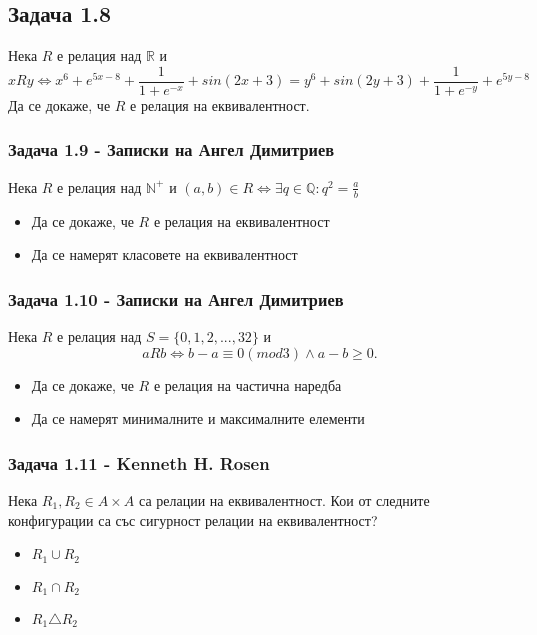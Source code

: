 \documentclass[12pt]{article}
\begin{document}
\subsection*{Задача 1.8}
Нека $R$ е релация над $\mathbb{R}$ и 
\begin{equation*}
    xRy \iff x^6 + e^{5x - 8} + \frac{1}{1+e^{-x}} + sin(2x + 3) = y^6 + sin(2y + 3) + \frac{1}{1+e^{-y}} + e^{5y - 8}
\end{equation*}
Да се докаже, че $R$ е релация на еквивалентност.

\subsubsection*{Задача 1.9 - Записки на Ангел Димитриев}
Нека $R$ е релация над $\mathbb{N}^+$ и $(a, b) \in R \iff \exists q \in \mathbb{Q}: q^2 = \frac{a}{b}$
\begin{itemize}
    \item Да се докаже, че $R$ е релация на еквивалентност
    \item Да се намерят класовете на еквивалентност
\end{itemize}

\subsubsection*{Задача 1.10 - Записки на Ангел Димитриев}
Нека $R$ е релация над $S = \{ 0, 1, 2, ..., 32 \}$ и 
\begin{equation*}
    aRb \iff b - a \equiv 0 (mod 3) \land a - b \geq 0.
\end{equation*}

\begin{itemize}
    \item Да се докаже, че $R$ е релация на частична наредба
    \item Да се намерят минималните и максималните елементи
\end{itemize}

\subsubsection*{Задача 1.11 - Kenneth H. Rosen}
Нека $R_1, R_2 \in A \times A$ са релации на еквивалентност. Кои от следните конфигурации са със сигурност релации на еквивалентност?
\begin{itemize}
    \item $R_1 \cup R_2$
    \item $R_1 \cap R_2$
    \item $R_1 \triangle R_2$
\end{itemize}
\end{document}
